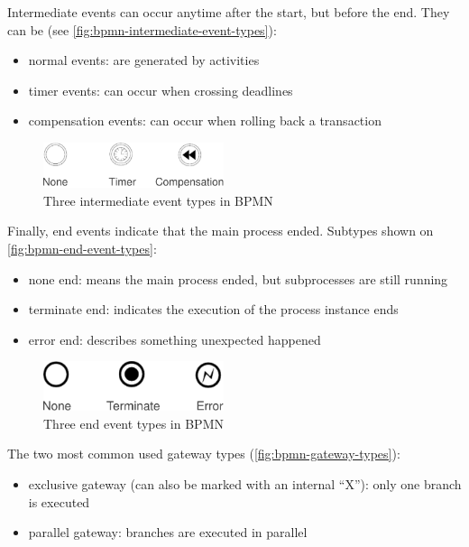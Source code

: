 Intermediate events can occur anytime after the start, but before the end. They
can be (see \autoref{fig:bpmn-intermediate-event-types}):

\begin{itemize}
\item normal events: are generated by activities
\item timer events: can occur when crossing deadlines
\item compensation events: can occur when rolling back a transaction
\end{itemize}

\begin{figure}[H]
\centering
\includegraphics[width=200px,keepaspectratio]{bpmn-intermediate-event-types.pdf}
\caption{Three intermediate event types in BPMN}
\label{fig:bpmn-intermediate-event-types}
\end{figure}

Finally, end events indicate that the main process ended. Subtypes shown on
\autoref{fig:bpmn-end-event-types}:

\begin{itemize}
\item none end: means the main process ended, but subprocesses are still running
\item terminate end: indicates the execution of the process instance ends
\item error end: describes something unexpected happened
\end{itemize}

\begin{figure}[H]
\centering
\includegraphics[width=200px,keepaspectratio]{bpmn-end-event-types.pdf}
\caption{Three end event types in BPMN}
\label{fig:bpmn-end-event-types}
\end{figure}

The two most common used gateway types (\autoref{fig:bpmn-gateway-types}):

\begin{itemize}
\item exclusive gateway (can also be marked with an internal ``X''): only one branch is executed
\item parallel gateway: branches are executed in parallel
\end{itemize}

